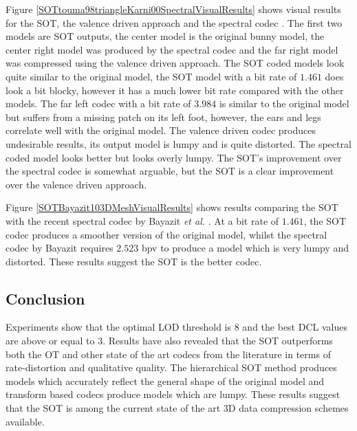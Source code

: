 Figure \ref{SOTtouma98triangleKarni00SpectralVisualResults} shows visual results for the SOT, the valence driven approach \cite{touma98triangle} and the spectral codec \cite{Karni00Spectral}. The first two models are SOT outputs, the center model is the original bunny model, the center right model was produced by the spectral codec and the far right model was compressed using the valence driven approach. The SOT coded models look quite similar to the original model, the SOT model with a bit rate of $1.461$ does look a bit blocky, however it has a much lower bit rate compared with the other models. The far left codec with a bit rate of $3.984$ is similar to the original model but suffers from a missing patch on its left foot, however, the ears and legs correlate well with the original model. The valence driven codec produces undesirable results, its output model is lumpy and is quite distorted. The spectral coded model looks better but looks overly lumpy. The SOT's improvement over the spectral codec is somewhat arguable, but the SOT is a clear improvement over the valence driven approach.


Figure \ref{SOTBayazit103DMeshVisualResults} shows results comparing the SOT with the recent spectral codec by Bayazit \textit{et al.} \cite{Bayazit103DMesh}. At a bit rate of $1.461$, the SOT codec produces a smoother version of the original model, whilst the spectral codec by Bayazit requires $2.523$ bpv to produce a model which is very lumpy and distorted. These results suggest the SOT is the better codec.

\subsection{Conclusion}

Experiments show that the optimal LOD threshold is $8$ and the best DCL values are above or equal to $3$. Results have also revealed that the SOT outperforms both the OT and other state of the art codecs from the literature in terms of rate-distortion and qualitative quality. The hierarchical SOT method produces models which accurately reflect the general shape of the original model and transform based codecs produce models which are lumpy. These results suggest that the SOT is among the current state of the art 3D data compression schemes available.

